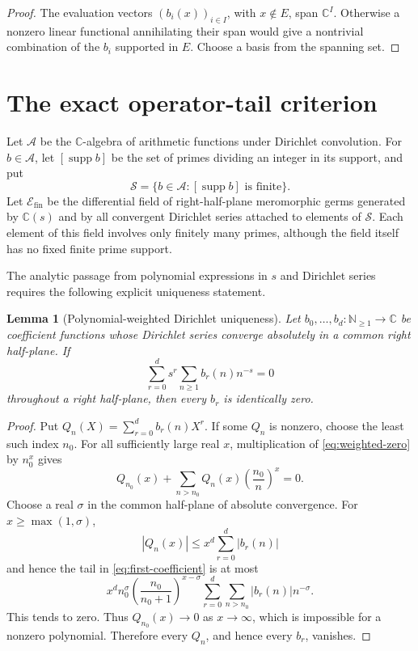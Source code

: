 \documentclass[11pt]{article}
\newtheorem{lemma}[theorem]{Lemma}
\theoremstyle{definition}
\theoremstyle{remark}
\newcommand{\C}{\mathbb C}
\newcommand{\N}{\mathbb N}
\newcommand{\supp}{\operatorname{supp}}
\begin{document}
\begin{proof}
The evaluation vectors \((b_i(x))_{i\in I}\), with \(x\notin E\), span \(\C^I\).
Otherwise a nonzero linear functional annihilating their span would give a nontrivial
combination of the \(b_i\) supported in \(E\).  Choose a basis from the spanning set.
\end{proof}

\section{The exact operator-tail criterion}

Let \(\mathscr A\) be the \(\C\)-algebra of arithmetic functions under Dirichlet
convolution.  For \(b\in\mathscr A\), let \([\supp b]\) be the set of primes dividing an
integer in its support, and put
\[
  \mathscr S
  =\{b\in\mathscr A:[\supp b]\text{ is finite}\}.
\]
Let \(\mathscr E_{\mathrm{fin}}\) be the differential field of right-half-plane
meromorphic germs generated by \(\C(s)\) and by all convergent Dirichlet series attached to
elements of \(\mathscr S\).  Each element of this field involves only finitely many primes,
although the field itself has no fixed finite prime support.

The analytic passage from polynomial expressions in \(s\) and Dirichlet series requires the
following explicit uniqueness statement.

\begin{lemma}[Polynomial-weighted Dirichlet uniqueness]
\label{lem:polynomial-weighted-uniqueness}
Let \(b_0,\ldots,b_d:\N_{\geq1}\to\C\) be coefficient functions whose Dirichlet
series converge absolutely in a common right half-plane.  If
\begin{equation}\label{eq:weighted-zero}
  \sum_{r=0}^d s^r\sum_{n\geq1}b_r(n)n^{-s}=0
\end{equation}
throughout a right half-plane, then every \(b_r\) is identically zero.
\end{lemma}

\begin{proof}
Put \(Q_n(X)=\sum_{r=0}^d b_r(n)X^r\).  If some \(Q_n\) is nonzero, choose the least
such index \(n_0\).  For all sufficiently large real \(x\), multiplication of
\eqref{eq:weighted-zero} by \(n_0^x\) gives
\begin{equation}\label{eq:first-coefficient}
  Q_{n_0}(x)
  +
  \sum_{n>n_0}Q_n(x)\left(\frac{n_0}{n}\right)^x
  =0.
\end{equation}
Choose a real \(\sigma\) in the common half-plane of absolute convergence.  For
\(x\geq\max(1,\sigma)\),
\[
  |Q_n(x)|\leq x^d\sum_{r=0}^d|b_r(n)|
\]
and hence the tail in \eqref{eq:first-coefficient} is at most
\[
  x^d n_0^\sigma
  \left(\frac{n_0}{n_0+1}\right)^{x-\sigma}
  \sum_{r=0}^d\sum_{n>n_0}|b_r(n)|n^{-\sigma}.
\]
This tends to zero.  Thus \(Q_{n_0}(x)\to0\) as \(x\to\infty\), which is impossible
for a nonzero polynomial.  Therefore every \(Q_n\), and hence every \(b_r\), vanishes.
\end{proof}
\end{document}
